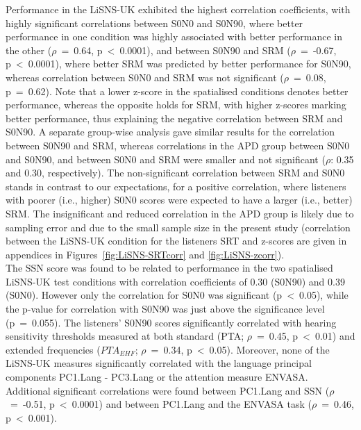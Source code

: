 \documentclass[a4paper, twoside]{templates/ociamthesis}
\begin{document}
Performance in the LiSNS-UK exhibited the highest correlation coefficients, with highly significant correlations between S0N0 and S0N90, where better performance in one condition was highly associated with better performance in the other (\(\rho\)~=~0.64, p~\textless~0.0001), and between S0N90 and SRM (\(\rho\)~=~-0.67, p~\textless~0.0001), where better SRM was predicted by better performance for S0N90, whereas correlation between S0N0 and SRM was not significant (\(\rho\)~=~0.08, p~=~0.62). Note that a lower z-score in the spatialised conditions denotes better performance, whereas the opposite holds for SRM, with higher z-scores marking better performance, thus explaining the negative correlation between SRM and S0N90. A separate group-wise analysis gave similar results for the correlation between S0N90 and SRM, whereas correlations in the APD group between S0N0 and S0N90, and between S0N0 and SRM were smaller and not significant (\(\rho\): 0.35 and 0.30, respectively). The non-significant correlation between SRM and S0N0 stands in contrast to our expectations, for a positive correlation, where listeners with poorer (i.e., higher) S0N0 scores were expected to have a larger (i.e., better) SRM. The insignificant and reduced correlation in the APD group is likely due to sampling error and due to the small sample size in the present study (correlation between the LiSNS-UK condition for the listeners SRT and z-scores are given in appendices in Figures~\ref{fig:LiSNS-SRTcorr} and \ref{fig:LiSNS-zcorr}).\\

The SSN score was found to be related to performance in the two spatialised LiSNS-UK test conditions with correlation coefficients of 0.30 (S0N90) and 0.39 (S0N0). However only the correlation for S0N0 was significant (p~\textless~0.05), while the p-value for correlation with S0N90 was just above the significance level (p~=~0.055). The listeners' S0N90 scores significantly correlated with hearing sensitivity thresholds measured at both standard (PTA; \(\rho\)~=~0.45, p~\textless~0.01) and extended frequencies (\(PTA_{EHF}\); \(\rho\)~=~0.34, p~\textless~0.05). Moreover, none of the LiSNS-UK measures significantly correlated with the language principal components PC1.Lang - PC3.Lang or the attention measure ENVASA. Additional significant correlations were found between PC1.Lang and SSN (\(\rho\)~=~-0.51, p~\textless~0.0001) and between PC1.Lang and the ENVASA task (\(\rho\)~=~0.46, p~\textless~0.001).\\
\end{document}
